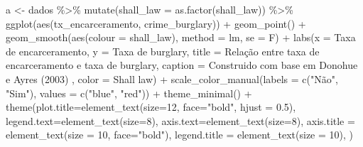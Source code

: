 \documentclass[
]{article}
\newenvironment{Shaded}{\begin{snugshade}}{\end{snugshade}}
\newcommand{\AttributeTok}[1]{\textcolor[rgb]{0.77,0.63,0.00}{#1}}
\newcommand{\DecValTok}[1]{\textcolor[rgb]{0.00,0.00,0.81}{#1}}
\newcommand{\FloatTok}[1]{\textcolor[rgb]{0.00,0.00,0.81}{#1}}
\newcommand{\FunctionTok}[1]{\textcolor[rgb]{0.00,0.00,0.00}{#1}}
\newcommand{\NormalTok}[1]{#1}
\newcommand{\OtherTok}[1]{\textcolor[rgb]{0.56,0.35,0.01}{#1}}
\newcommand{\SpecialCharTok}[1]{\textcolor[rgb]{0.00,0.00,0.00}{#1}}
\newcommand{\StringTok}[1]{\textcolor[rgb]{0.31,0.60,0.02}{#1}}
\begin{document}
\begin{Shaded}
\begin{Highlighting}[]
\NormalTok{a }\OtherTok{\textless{}{-}}\NormalTok{ dados }\SpecialCharTok{\%\textgreater{}\%} 
  \FunctionTok{mutate}\NormalTok{(}\AttributeTok{shall\_law =} \FunctionTok{as.factor}\NormalTok{(shall\_law)) }\SpecialCharTok{\%\textgreater{}\%} 
  \FunctionTok{ggplot}\NormalTok{(}\FunctionTok{aes}\NormalTok{(tx\_encarceramento, crime\_burglary)) }\SpecialCharTok{+}
  \FunctionTok{geom\_point}\NormalTok{() }\SpecialCharTok{+} 
  \FunctionTok{geom\_smooth}\NormalTok{(}\FunctionTok{aes}\NormalTok{(}\AttributeTok{colour =}\NormalTok{ shall\_law), }\AttributeTok{method =} \StringTok{\textquotesingle{}lm\textquotesingle{}}\NormalTok{, }\AttributeTok{se =}\NormalTok{ F) }\SpecialCharTok{+}
  \FunctionTok{labs}\NormalTok{(}\AttributeTok{x =} \StringTok{\textquotesingle{}Taxa de encarceramento\textquotesingle{}}\NormalTok{,}
       \AttributeTok{y =} \StringTok{\textquotesingle{}Taxa de burglary\textquotesingle{}}\NormalTok{,}
       \AttributeTok{title =} \StringTok{\textquotesingle{}Relação entre taxa de encarceramento e taxa de burglary\textquotesingle{}}\NormalTok{,}
       \AttributeTok{caption =} \StringTok{\textquotesingle{}Construido com base em Donohue e Ayres (2003)\textquotesingle{}}\NormalTok{ ,}
       \AttributeTok{color =} \StringTok{\textquotesingle{}Shall law\textquotesingle{}}\NormalTok{) }\SpecialCharTok{+} 
  \FunctionTok{scale\_color\_manual}\NormalTok{(}\AttributeTok{labels =} \FunctionTok{c}\NormalTok{(}\StringTok{"Não"}\NormalTok{, }\StringTok{"Sim"}\NormalTok{), }\AttributeTok{values =} \FunctionTok{c}\NormalTok{(}\StringTok{"blue"}\NormalTok{, }\StringTok{"red"}\NormalTok{)) }\SpecialCharTok{+} 
  \FunctionTok{theme\_minimal}\NormalTok{() }\SpecialCharTok{+}
  \FunctionTok{theme}\NormalTok{(}\AttributeTok{plot.title=}\FunctionTok{element\_text}\NormalTok{(}\AttributeTok{size=}\DecValTok{12}\NormalTok{, }\AttributeTok{face=}\StringTok{"bold"}\NormalTok{, }\AttributeTok{hjust =} \FloatTok{0.5}\NormalTok{),}
        \AttributeTok{legend.text=}\FunctionTok{element\_text}\NormalTok{(}\AttributeTok{size=}\DecValTok{8}\NormalTok{),}
        \AttributeTok{axis.text=}\FunctionTok{element\_text}\NormalTok{(}\AttributeTok{size=}\DecValTok{8}\NormalTok{),}
        \AttributeTok{axis.title =} \FunctionTok{element\_text}\NormalTok{(}\AttributeTok{size =} \DecValTok{10}\NormalTok{, }\AttributeTok{face=}\StringTok{"bold"}\NormalTok{),}
        \AttributeTok{legend.title =} \FunctionTok{element\_text}\NormalTok{(}\AttributeTok{size =} \DecValTok{10}\NormalTok{),}
\NormalTok{        )}


\end{Highlighting}
\end{Shaded}
\end{document}
